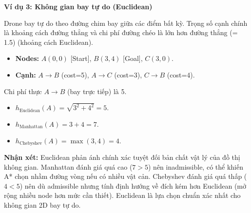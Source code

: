 \documentclass[13pt,a4paper]{article}
\begin{document}
\textbf{Ví dụ 3: Không gian bay tự do (Euclidean)}

Drone bay tự do theo đường chim bay giữa các điểm bất kỳ. Trọng số cạnh chính là khoảng cách đường thẳng và chi phí đường chéo là lớn hơn đường thẳng (= 1.5) (khoảng cách Euclidean).
\begin{itemize}
    \item \textbf{Nodes:} $A(0,0)$ [Start], $B(3,4)$ [Goal], $C(3,0)$.
    \item \textbf{Cạnh:} $A \to B$ (cost=5), $A \to C$ (cost=3), $C \to B$ (cost=4).
\end{itemize}

Chi phí thực $A \to B$ (bay trực tiếp) là 5.
\begin{itemize}
    \item $h_{\text{Euclidean}}(A) = \sqrt{3^2+4^2} = 5$.
    \item $h_{\text{Manhattan}}(A) = 3 + 4 = 7$.
    \item $h_{\text{Chebyshev}}(A) = \max(3, 4) = 4$.
\end{itemize}
\textbf{Nhận xét:} Euclidean phản ánh chính xác tuyệt đối bản chất vật lý của đồ thị không gian. Manhattan đánh giá quá cao ($7 > 5$) nên inadmissible, có thể khiến A* chọn nhầm đường vòng nếu có nhiều vật cản. Chebyshev đánh giá quá thấp ($4 < 5$) nên dù admissible nhưng tính định hướng về đích kém hơn Euclidean (mở rộng nhiều node hơn mức cần thiết). Euclidean là lựa chọn chuẩn xác nhất cho không gian 2D bay tự do.
\end{document}
